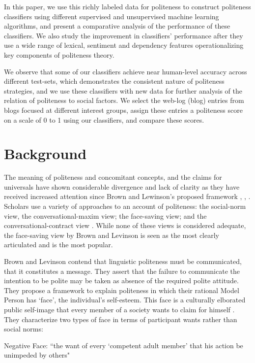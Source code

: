 \documentclass[conference]{IEEEtran}
\begin{document}
In this paper, we use this richly labeled data for politeness to construct politeness classifiers using different supervised and unsupervised machine learning algorithms, and present a comparative analysis of the performance of these classifiers. We also study the improvement in classifiers' performance after they use a wide range of lexical, sentiment and dependency features operationalizing key components of politeness theory. 

We observe that some of our classifiers achieve near human-level accuracy across different test-sets, which demonstrates the consistent nature of politeness strategies, and we use these classifiers with new data for further analysis of the relation of politeness to social factors. We select the web-log (blog) entries from blogs focused at different interest groups, assign these entries a politeness score on a scale of 0 to 1 using our classifiers, and compare these scores. 


\section{Background}
The meaning of politeness and concomitant concepts, and the claims for universals have shown considerable divergence and lack of clarity as they have received increased attention since Brown and Lewinson's proposed framework \cite{Meier}, \cite{Brown1}, \cite{Brown2}. Scholars use a variety of approaches to an account of politeness: the social-norm view, the conversational-maxim view; the face-saving view; and the conversational-contract view \cite{Fraser}. While none of these views is considered adequate, the face-saving view by Brown and Levinson is seen as the most clearly articulated and is the most popular.

Brown and Levinson contend that linguistic politeness must be communicated, that it constitutes a message. They assert that the failure to communicate the intention to be polite may be taken as absence of the required polite attitude. They propose a framework to explain politeness in which their rational Model Person has `face', the individual's self-esteem. This face is a culturally elborated public self-image that every member of a society wants to claim for himself \cite{Fraser}. They characterize two types of face in terms of participant wants rather than social norms:

Negative Face:
``the want of every `competent adult member' that his action be unimpeded by others" 
\end{document}
